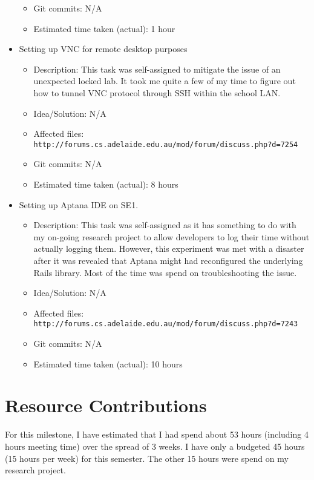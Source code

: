 \begin{itemize}
\begin{itemize}
	         \item Git commits: N/A
	         \item Estimated time taken (actual): 1 hour
	     \end{itemize}
	\item Setting up VNC for remote desktop purposes
	     \begin{itemize}
	         \item Description: This task was self-assigned to mitigate the issue of an unexpected locked lab. It took me quite a few of my time to figure out how to tunnel VNC protocol through SSH within the school LAN.  
	         \item Idea/Solution: N/A
	         \item Affected files: \texttt{http://forums.cs.adelaide.edu.au/mod/forum/discuss.php?d=7254}
	         \item Git commits: N/A
	         \item Estimated time taken (actual): 8 hours
	     \end{itemize}
	\item Setting up Aptana IDE on SE1. 
	      \begin{itemize}
	         \item Description: This task was self-assigned as it has something to do with my on-going research project to allow developers to log their time without actually logging them. However, this experiment was met with a disaster after it was revealed that Aptana might had reconfigured the underlying Rails library. Most of the time was spend on troubleshooting the issue.
	         \item Idea/Solution: N/A
	         \item Affected files: \texttt{http://forums.cs.adelaide.edu.au/mod/forum/discuss.php?d=7243}
	         \item Git commits: N/A
	         \item Estimated time taken (actual): 10 hours
	     \end{itemize}
\end{itemize}

\section*{Resource Contributions}

For this milestone, I have estimated that I had spend about 53 hours (including 4 hours meeting time) over the spread of 3 weeks. I have only a budgeted 45 hours (15 hours per week) for this semester. The other 15 hours were spend on my research project. 

